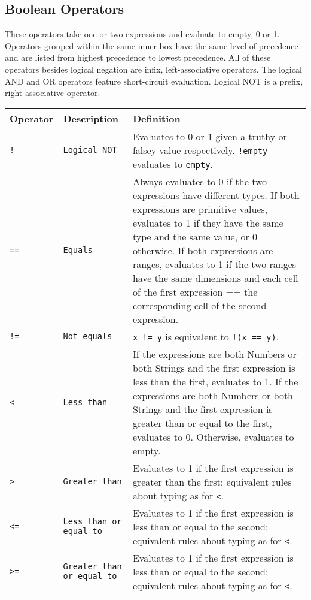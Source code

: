 		\subsection{Boolean Operators}
			These operators take one or two expressions and evaluate to empty, 0 or 1. Operators grouped within the same inner box have the same level of precedence and are listed from highest precedence to lowest precedence. All of these operators besides logical negation are infix, left-associative operators. The logical AND and OR operators feature short-circuit evaluation. Logical NOT is a prefix, right-associative operator.
			\begin{table}[H]
			\begin{tabular}{ |p{2cm}|p{5cm}|p{7cm}|  }
			\hline
			\textbf{Operator} & \textbf{Description} & \textbf{Definition} \\ \hline
			\rule{0pt}{3ex}\texttt{!} & \texttt{Logical NOT} & {Evaluates to 0 or 1 given a truthy or falsey value respectively. \texttt{!empty} evaluates to \texttt{empty}.} \\ \hline
			\rule{0pt}{3ex}\texttt{==} & \texttt{Equals} & {Always evaluates to 0 if the two expressions have different types. If both expressions are primitive values, evaluates to 1 if they have the same type and the same value, or 0 otherwise. If both expressions are ranges, evaluates to 1 if the two ranges have the same dimensions and each cell of the first expression == the corresponding cell of the second expression.} \\
			\rule{0pt}{3ex}\texttt{!=} & \texttt{Not equals} & {\texttt{x != y} is equivalent to \texttt{!(x == y)}.} \\
			\rule{0pt}{3ex}\texttt{<} & \texttt{Less than} & {If the expressions are both Numbers or both Strings and the first expression is less than the first, evaluates to 1. If the expressions are both Numbers or both Strings and the first expression is greater than or equal to the first, evaluates to 0. Otherwise, evaluates to empty.} \\
			\rule{0pt}{3ex}\texttt{>} & \texttt{Greater than} & {Evaluates to 1 if the first expression is greater than the first; equivalent rules about typing as for \texttt{<}.} \\
			\rule{0pt}{3ex}\texttt{<=} & \texttt{Less than or equal to} & {Evaluates to 1 if the first expression is less than or equal to the second; equivalent rules about typing as for \texttt{<}.} \\
			\rule{0pt}{3ex}\texttt{>=} & \texttt{Greater than or equal to} & {Evaluates to 1 if the first expression is less than or equal to the second; equivalent rules about typing as for \texttt{<}.} \\ \hline

\end{tabular}
\end{table}
